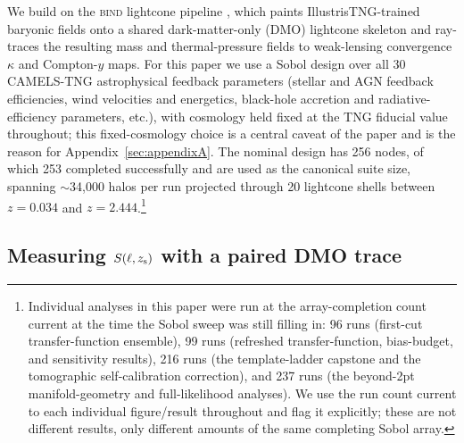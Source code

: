 \documentclass[11pt]{article}
\newcommand{\bind}{\textsc{bind}}
\newcommand{\sez}{S(\ell, z_{\rm s})}
\begin{document}
We build on the \bind{} lightcone pipeline \citep[Paper~I]{bindI}, which paints
IllustrisTNG-trained baryonic fields onto a shared dark-matter-only (DMO)
lightcone skeleton and ray-traces the resulting mass and thermal-pressure
fields to weak-lensing convergence $\kappa$ and Compton-$y$ maps. For this
paper we use a Sobol design over all 30 CAMELS-TNG astrophysical feedback
parameters (stellar and AGN feedback efficiencies, wind velocities and
energetics, black-hole accretion and radiative-efficiency parameters, etc.),
with cosmology held fixed at the TNG fiducial value throughout; this fixed-cosmology
choice is a central caveat of the paper and is the reason for
Appendix~\ref{sec:appendixA}. The nominal design has 256 nodes, of which 253
completed successfully and are used as the canonical suite size, spanning
$\sim$34,000 halos per run projected through 20 lightcone shells between
$z=0.034$ and $z=2.444$.\footnote{Individual analyses in this paper were run
at the array-completion count current at the time the Sobol sweep was still
filling in: 96 runs (first-cut transfer-function ensemble), 99 runs
(refreshed transfer-function, bias-budget, and sensitivity results), 216
runs (the template-ladder capstone and the tomographic self-calibration
correction), and 237 runs (the beyond-2pt manifold-geometry and full-likelihood
analyses). We use the run count current to each individual figure/result
throughout and flag it explicitly; these are not different results, only
different amounts of the same completing Sobol array.} %

\subsection{Measuring $\sez$ with a paired DMO trace}\label{sec:transfer}
\end{document}
